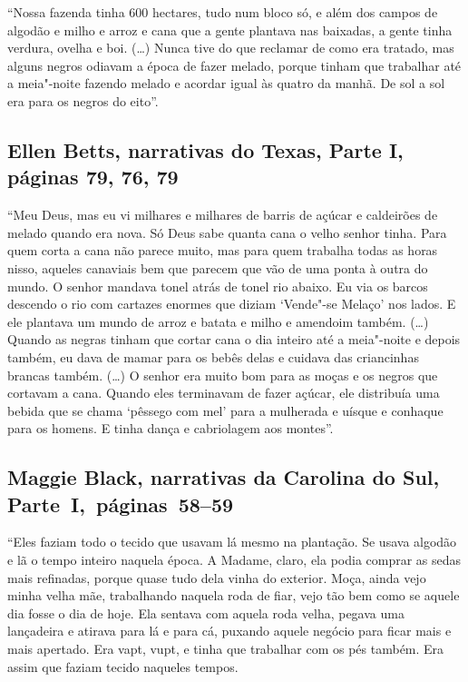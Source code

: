 ``Nossa fazenda tinha 600 hectares, tudo num bloco só, e além dos campos
de algodão e milho e arroz e cana que a gente plantava nas baixadas, a
gente tinha verdura, ovelha e boi. (\ldots{}) Nunca tive do que reclamar
de como era tratado, mas alguns negros odiavam a época de fazer melado,
porque tinham que trabalhar até a meia"-noite fazendo melado e acordar
igual às quatro da manhã. De sol a sol era para os negros do eito''.

\subsection{Ellen Betts, narrativas do Texas, Parte I, páginas 79, 76, 79} \label{ref25}

``Meu Deus, mas eu vi milhares e milhares de barris de açúcar e
caldeirões de melado quando era nova. Só Deus sabe quanta cana o velho
senhor tinha. Para quem corta a cana não parece muito, mas para quem
trabalha todas as horas nisso, aqueles canaviais bem que parecem que vão
de uma ponta à outra do mundo. O senhor mandava tonel atrás de tonel rio
abaixo. Eu via os barcos descendo o rio com cartazes enormes que diziam
`Vende"-se Melaço' nos lados. E ele plantava um mundo de arroz e batata e
milho e amendoim também. (\ldots{}) Quando as negras tinham que cortar
cana o dia inteiro até a meia"-noite e depois também, eu dava de mamar
para os bebês delas e cuidava das criancinhas brancas também. (\ldots{})
O senhor era muito bom para as moças e os negros que cortavam a cana.
Quando eles terminavam de fazer açúcar, ele distribuía uma bebida que se
chama `pêssego com mel' para a mulherada e uísque e conhaque para os
homens. E tinha dança e cabriolagem aos montes''.

\subsection{Maggie Black, narrativas da Carolina do Sul, Parte~I,~páginas~58--59} \label{ref26}

``Eles faziam todo o tecido que usavam lá mesmo na plantação. Se usava
algodão e lã o tempo inteiro naquela época. A Madame, claro, ela podia
comprar as sedas mais refinadas, porque quase tudo dela vinha do
exterior. Moça, ainda vejo minha velha mãe, trabalhando naquela roda de
fiar, vejo tão bem como se aquele dia fosse o dia de hoje. Ela sentava
com aquela roda velha, pegava uma lançadeira e atirava para lá e para
cá, puxando aquele negócio para ficar mais e mais apertado. Era vapt,
vupt, e tinha que trabalhar com os pés também. Era assim que faziam
tecido naqueles tempos.

